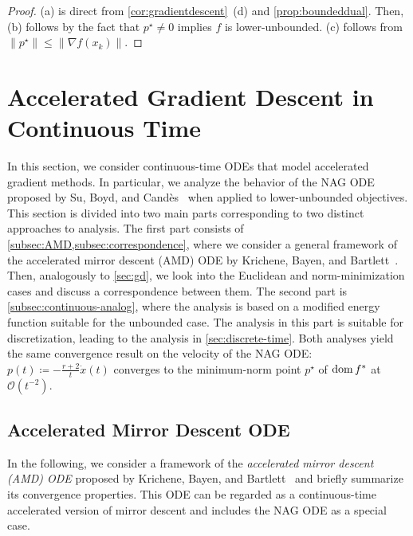 \documentclass[11pt,a4paper]{article}
\theoremstyle{definition}
\theoremstyle{plain}
\newcommand{\dom}{\mathop{\rm dom}}
\begin{document}
\begin{proof}
    (a) is direct from \cref{cor:gradientdescent}~(d) and \cref{prop:boundeddual}.
    Then, (b) follows by the fact that $p^\star \neq 0$ implies $f$ is lower-unbounded.
    (c) follows from $\|p^\star\| \le \|\nabla f(x_k)\|$.
\end{proof}

\section{Accelerated Gradient Descent in Continuous Time}
\label{sec:continuous-time}
In this section, we consider continuous-time ODEs that model accelerated gradient methods.
In particular, we analyze the behavior of the NAG ODE proposed by Su, Boyd, and Cand\`{e}s~\cite{SBC2016} when applied to lower-unbounded objectives.
This section is divided into two main parts corresponding to two distinct approaches to analysis.
The first part consists of \cref{subsec:AMD,subsec:correspondence}, where we consider a general framework of the accelerated mirror descent (AMD) ODE by Krichene, Bayen, and Bartlett~\cite{KBB2015}.
Then, analogously to \cref{sec:gd}, we look into the Euclidean and norm-minimization cases and discuss a correspondence between them.
The second part is \cref{subsec:continuous-analog}, where the analysis is based on a modified energy function suitable for the unbounded case.
The analysis in this part is suitable for discretization, leading to the analysis in \cref{sec:discrete-time}.
Both analyses yield the same convergence result on the velocity of the NAG ODE: $p(t) \coloneqq -\frac{r + 2}{t}\dot x(t)$ converges to the minimum-norm point $p^\star$ of $\dom f^\ast$ at $\mathcal{O}(t^{-2})$.

\subsection{Accelerated Mirror Descent ODE}
\label{subsec:AMD}
In the following, we consider a framework of the \textit{accelerated mirror descent (AMD) ODE} proposed by Krichene, Bayen, and Bartlett~\cite{KBB2015} and briefly summarize its convergence properties.
This ODE can be regarded as a continuous-time accelerated version of mirror descent and includes the NAG ODE \cite{SBC2016} as a special case.
\end{document}
